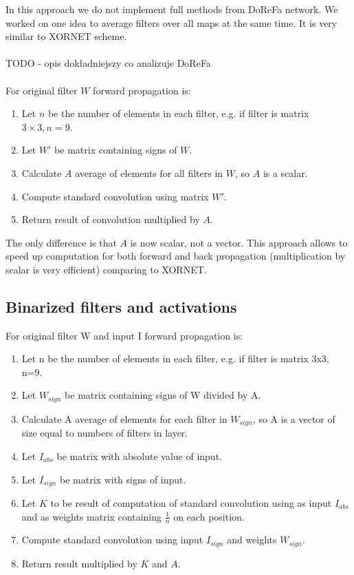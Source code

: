 \documentclass[licencjacka]{pracamgr}
\begin{document}
		        In this approach we do not implement full methods from DoReFa network. We worked on one idea to average filters over all maps at the same time. It is very similar to XORNET scheme. 
		        \\\\
		        TODO - opis dokładniejszy co analizuje DoReFa 
		        \\\\
		        For original filter $W$ forward propagation is:
		        \begin{enumerate}
		                \item Let $n$ be the number of elements in each filter, e.g. if filter is matrix $3 \times 3, n=9$.
		                \item Let $W'$ be matrix containing signs of $W$.
		                \item Calculate $A$ average of elements for all filters in $W$, so $A$ is a scalar.
		                \item Compute standard convolution using matrix $W'$.
		                \item Return result of convolution multiplied by $A$.
		        \end{enumerate}

		        The only difference is that $A$ is now scalar, not a vector. This approach allows to speed up computation for both forward and back propagation (multiplication by scalar is very efficient) comparing to XORNET.

		\subsection{Binarized filters and activations}
		        For original filter W and input I forward propagation is:
		        \begin{enumerate}
		                \item Let n be the number of elements in each filter, e.g. if filter is matrix 3x3, n=9.
		                \item Let $W_{sign}$ be matrix containing signs of W divided by A.
		                \item Calculate A average of elements for each filter in $W_{sign}$, so A is a vector of size equal to numbers of filters in layer.
		                \item Let $I_{abs}$ be matrix with absolute value of input.
		                \item Let $I_{sign}$ be matrix with signs of input.
		                \item Let $K$ to be result of computation of standard convolution using as input $I_{abs}$ and as weights matrix containing $\frac{1}{n}$ on each position.
		                \item Compute standard convolution using input $I_{sign}$ and weights $W_{sign}$.
		                \item Return result multiplied by $K$ and $A$.
		        \end{enumerate}
\end{document}
